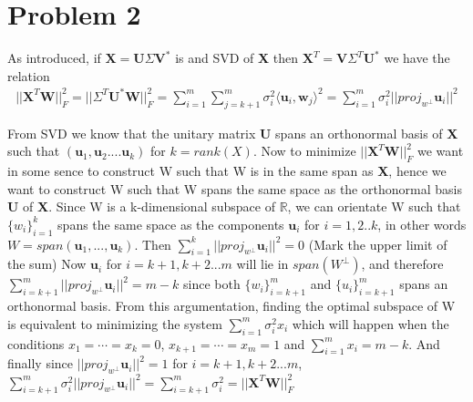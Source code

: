 \documentclass[a4paper,norsk]{article}
\begin{document}
\section{Problem 2}
As introduced, if $\textbf{X} = \textbf{U} \Sigma \textbf{V}^*$ is and SVD of \textbf{X} then  $\textbf{X}^T = \textbf{V} \Sigma^T \textbf{U}^*$ we have the relation \newline
\begin{align*}
||\textbf{X}^T \textbf{W}||_F^2 = ||\Sigma^T \textbf{U}^* \textbf{W}||_F^2 = \sum_{i=1}^m \sum_{j=k+1}^m \sigma_i^2  \langle \textbf{u}_i , \textbf{w}_j\rangle^2 =
\sum_{i=1}^m \sigma_i^2 || proj_{w^{\perp}} \textbf{u}_i||^2 
\end{align*}

From SVD we know that the unitary matrix \textbf{U} spans an orthonormal basis of \textbf{X} such that $(\textbf{u}_1, \textbf{u}_2 .... \textbf{u}_k)$ for $k=rank(X)$. Now to minimize 
$||\textbf{X}^T \textbf{W}||_F^2$ we want in some sence to construct W such that W is in the same span as \textbf{X}, hence we want to construct W such that W spans the same space as the
orthonormal basis \textbf{U} of \textbf{X}. \newline \newline
Since W is a k-dimensional subspace of $\mathbb{R}$, we can orientate W such that $\{w_i\}_{i=1}^{k}$ spans the same space as the components $\textbf{u}_i$ for $i=1,2..k$, in other words
$W = span(\textbf{u}_1, ..., \textbf{u}_k )$. \newline
Then $\sum_{i=1}^k || proj_{w^{\perp}} \textbf{u}_i||^2 = 0$ (Mark the upper limit of the sum) \newline
Now $\textbf{u}_i$ for $i=k+1, k+2...m$ will lie in $span(W^\perp)$, and therefore $\sum_{i=k+1}^m || proj_{w^{\perp}} \textbf{u}_i||^2 = m-k$ since both  $\{w_i\}_{i=k+1}^{m}$ and
 $\{u_i\}_{i=k+1}^{m}$ spans an orthonormal basis. \newline \newline
From this argumentation, finding the optimal subspace of W is equivalent to minimizing the system $\sum_{i=1}^m \sigma_i^2 x_i$ which will happen when the conditions
$x_1 = \cdots = x_k = 0$, \hspace{2mm} $x_{k+1} = \cdots = x_m = 1 $ and $\sum_{i=1}^m x_i = m - k$. \newline \newline
And finally since $|| proj_{w^{\perp}} \textbf{u}_i||^2 = 1$ for $i=k+1, k+2...m$, \newline \newline
$\sum_{i=k+1}^m \sigma_i^2 || proj_{w^{\perp}} \textbf{u}_i||^2 = \sum_{i=k+1}^m \sigma_i^2 = ||\textbf{X}^T \textbf{W}||_F^2$
\end{document}
